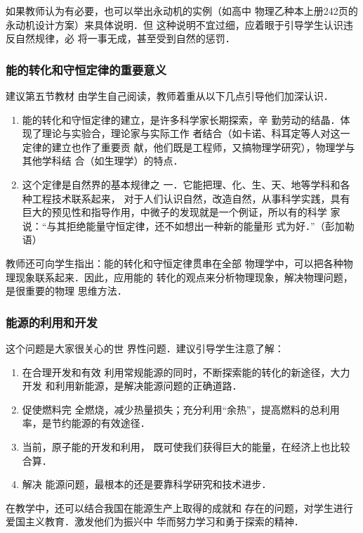 如果教师认为有必要，也可以举出永动机的实例（如高中
物理乙种本上册242页的永动机设计方案）来具体说明．但
这种说明不宜过细，应着眼于引导学生认识违反自然规律，必
将一事无成，甚至受到自然的惩罚．

\subsubsection{能的转化和守恒定律的重要意义}

建议第五节教材
由学生自己阅读，教师着重从以下几点引导他们加深认识．
\begin{enumerate}
\item 能的转化和守恒定律的建立，是许多科学家长期探索，辛
勤劳动的结晶．体现了理论与实验合，理论家与实际工作
者结合（如卡诺、科耳定等人对这一定律的建立也作了重要贡
献，他们既是工程师，又搞物理学研究），物理学与其他学科结
合（如生理学）的特点．
\item 这个定律是自然界的基本规律之
一．它能把理、化、生、天、地等学科和各种工程技术联系起来，
对于人们认识自然，改造自然，从事科学实践，具有巨大的预见性和指导作用，中微子的发现就是一个例证，所以有的科学
家说：“与其拒绝能量守恒定律，还不如想出一种新的能量形
式为好．”（彭加勒语）
\end{enumerate}

教师还可向学生指出：能的转化和守恒定律贯串在全部
物理学中，可以把各种物理现象联系起来．因此，应用能的
转化的观点来分析物理现象，解决物理问题，是很重要的物理
思维方法．

\subsubsection{能源的利用和开发}
 这个问题是大家很关心的世
界性问题．建议引导学生注意了解：
\begin{enumerate}
\item 在合理开发和有效
利用常规能源的同时，不断探索能的转化的新途径，大力开发
和利用新能源，是解决能源问题的正确道路．    
\item 促使燃料完
全燃烧，减少热量损失；充分利用“余热”，提高燃料的总利用
率，是节约能源的有效途径．    
\item 当前，原子能的开发和利用，
既可使我们获得巨大的能量，在经济上也比较合算．   
 \item 解决
能源问题，最根本的还是要靠科学研究和技术进步．
\end{enumerate}

在教学中，还可以结合我国在能源生产上取得的成就和
存在的问题，对学生进行爱国主义教育．激发他们为振兴中
华而努力学习和勇于探索的精神．

